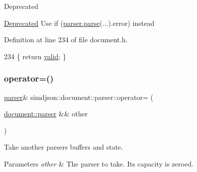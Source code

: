 \begin{DoxyRefDesc}{Deprecated}
\item[\hyperlink{deprecated__deprecated000006}{Deprecated}]Use {\ttfamily if (\hyperlink{classsimdjson_1_1document_1_1parser_a3eb1fd46ea0dad62eceed4b1c302b7ad}{parser.\+parse}(...).error)} instead \end{DoxyRefDesc}


Definition at line 234 of file document.\+h.


\begin{DoxyCode}
234 \{ \textcolor{keywordflow}{return} \hyperlink{classsimdjson_1_1document_1_1parser_a1aaf05806149d370d15140125038d3b2}{valid}; \}
\end{DoxyCode}
\mbox{\label{classsimdjson_1_1document_1_1parser_ab59a0096c2192266961b2d1f9f449470}} 
\subsubsection{\texorpdfstring{operator=()}{operator=()}}
{\footnotesize\ttfamily \hyperlink{classsimdjson_1_1document_1_1parser}{parser}\& simdjson\+::document\+::parser\+::operator= (\begin{DoxyParamCaption}\item[{\hyperlink{classsimdjson_1_1document_1_1parser}{document\+::parser} \&\&}]{other }\end{DoxyParamCaption})\hspace{0.3cm}{\ttfamily [default]}}



Take another parser\textquotesingle{}s buffers and state. 


\begin{DoxyParams}{Parameters}
{\em other} & The parser to take. Its capacity is zeroed. \\
\hline
\end{DoxyParams}
\mbox{\label{classsimdjson_1_1document_1_1parser_a3eb1fd46ea0dad62eceed4b1c302b7ad}} 
